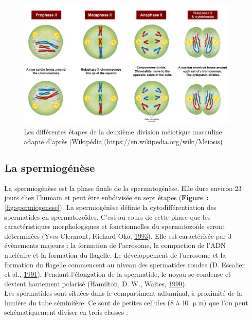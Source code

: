 \documentclass[12pt,twoside]{reedthesis}
\theoremstyle{definition}
\theoremstyle{definition}
\theoremstyle{remark}
\begin{document}
  \begin{figure}
  
  {\centering \includegraphics[scale=0.43]{figure/MeiosisII} 
  
  }
  
  \caption[Les différentes étapes de la deuxième division méiotique masculine adapté]{Les différentes étapes de la deuxième division méiotique masculine adapté d'après [Wikipédia](https://en.wikipedia.org/wiki/Meiosis)}\label{fig:meioseii}
  \end{figure}
  
  \newpage
  
  \hypertarget{spermiogenese}{\subsection{La
  spermiogénèse}\label{spermiogenese}}
  
  La spermiogénèse est la phase finale de la spermatogénèse. Elle dure
  environ 23 jours chez l'humain et peut être subdivisée en sept étapes
  (\textbf{Figure : }\ref{fig:spermiogenese}). La spermiogénèse définie la
  cytodifférentiation des spermatides en spermatozoïdes. C'est au cours de
  cette phase que les caractéristiques morphologiques et fonctionnelles du
  spermatozoïde seront déterminées (Yves Clermont, Richard Oko,
  \protect\hyperlink{ref-YvesClermontRichardOko1993}{1993}). Elle est
  caractérisée par 3 évènements majeurs : la formation de l'acrosome, la
  compaction de l'ADN nucléaire et la formation du flagelle. Le
  développement de l'acrosome et la formation du flagelle commencent au
  niveau des spermatides rondes (D. Escalier et al.,
  \protect\hyperlink{ref-Escalier1991}{1991}). Pendant l'élongation de la
  spermatide, le noyau se condense et devient hautement polarisé
  (Hamilton, D. W., Waites, \protect\hyperlink{ref-Hamilton1987}{1990}).\\
  Les spermatides sont situées dans le compartiment adluminal, à proximité
  de la lumière du tube séminifère. Ce sont de petites cellules (8 à 10
  \(\upmu\)m) que l'on peut schématiquement diviser en trois classes :
  
\end{document}
